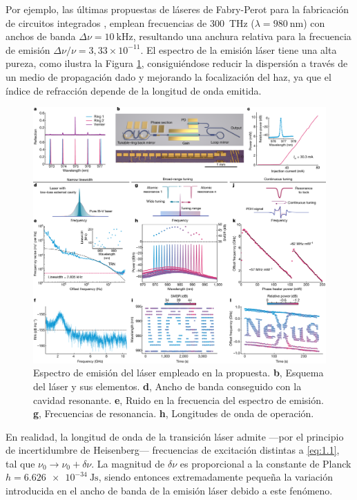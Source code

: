 Por ejemplo, las últimas propuestas de láseres de Fabry-Perot para la fabricación de circuitos integrados \autocite{Tran2022ExtendingWavelengths}, emplean frecuencias de \qty{300}{\THz} ($\lambda = \qty{980}{\nm}$) con anchos de banda $\Delta\nu = \qty{10}{\kHz}$, resultando una anchura relativa para la frecuencia de emisión $\Delta\nu/\nu = 3,33\times 10^{-11}$. El espectro de la emisión láser tiene una alta pureza, como ilustra la Figura \ref{fig:ch1_amplif}, consiguiéndose reducir la dispersión a través de un medio de propagación dado y mejorando la focalización del haz, ya que el índice de refracción depende de la longitud de onda emitida.

\begin{figure}[ht!]
    \centering
    \includegraphics[width=\textwidth]{Figuras/ch1_amplif.png}
    \caption{Espectro de emisión del láser empleado en la propuesta\autocite{Tran2022ExtendingWavelengths}. \textbf{b}, Esquema del láser y sus elementos. \textbf{d}, Ancho de banda conseguido con la cavidad resonante. \textbf{e}, Ruido en la frecuencia del espectro de emisión. \textbf{g}, Frecuencias de resonancia. \textbf{h}, Longitudes de onda de operación.}
    \label{fig:ch1_amplif}
\end{figure}

En realidad, la longitud de onda de la transición láser admite ---por el principio de incertidumbre de Heisenberg--- frecuencias de excitación distintas a \eqref{eq:1.1}, tal que $\nu_0\rightarrow\nu_0 + \delta\nu$. La magnitud de $\delta\nu$ es proporcional a la constante de Planck $h = \qty{6,626e-34}{\J\s}$, siendo entonces extremadamente pequeña la variación introducida en el ancho de banda de la emisión láser debido a este fenómeno. 

